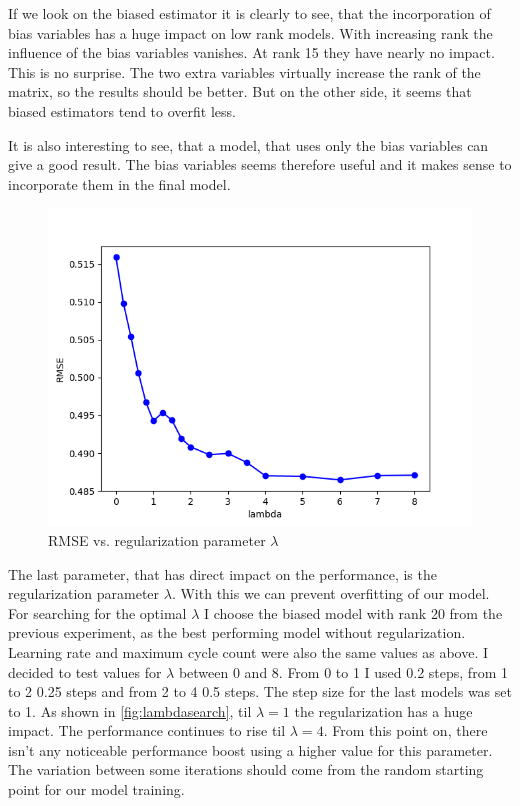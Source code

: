 \documentclass[DIV=14,twocolumn]{scrartcl}
\begin{document}
If we look on the biased estimator it is clearly to see, that the incorporation of bias variables has a huge impact on low rank models. With increasing rank the influence of the bias variables vanishes. At rank 15 they have nearly no impact. 
This is no surprise. The two extra variables virtually increase the rank of the matrix, so the results should be better.
But on the other side, it seems that biased estimators tend to overfit less.

It is also interesting to see, that a model, that uses only the bias variables can give a good result. The bias variables seems therefore useful and it makes sense to incorporate them in the final model.
\begin{figure}[h]
	\includegraphics[width=\columnwidth]{../img/lambda-rmse-validate}
	\caption{RMSE vs. regularization parameter $\lambda$}
	\label{fig:lambdasearch}
\end{figure}

The last parameter, that has direct impact on the performance, is the regularization parameter $\lambda$. With this we can prevent overfitting of our model. For searching for the optimal $\lambda$ I choose the biased model with rank 20 from the previous experiment, as the best performing model without regularization. Learning rate and maximum cycle count were also the same values as above. 
I decided to test values for $\lambda$ between 0 and 8. From 0 to 1 I used 0.2 steps, from 1 to 2 0.25 steps and from 2 to 4 0.5 steps. The step size for the last models was set to 1. As shown in \autoref{fig:lambdasearch}, til $\lambda=1$ the regularization has a huge impact. The performance continues to rise til $\lambda=4$. From this point on, there isn't any noticeable performance boost using a higher value for this parameter. 
The variation between some iterations should come from the random starting point for our model training. 
\end{document}
